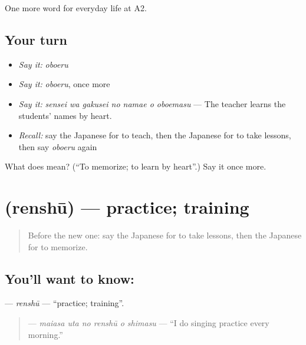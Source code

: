 \begin{grammarlens}[title={What you've built}]
One more word for everyday life at A2.
\end{grammarlens}

\subsection*{Your turn}
\begin{itemize}
\raggedright
  \item \emph{Say it:} \emph{oboeru}
  \item \emph{Say it:} \emph{oboeru}, once more
  \item \emph{Say it:} \emph{sensei wa gakusei no namae o oboemasu} — The teacher learns the students' names by heart.
  \item \emph{Recall:} say the Japanese for to teach, then the Japanese for to take lessons, then say \emph{oboeru} again
\end{itemize}

\begin{tcolorbox}[breakable,colback=teal!4,colframe=teal!35!black,title={Before you move on}]
What does  mean? (\textquotedblleft{}To memorize; to learn by heart\textquotedblright{}.) Say it once more.
\end{tcolorbox}
\section[\texorpdfstring{\ja{れんしゅう} (renshū)}{れんしゅう (renshū)}]{ (renshū) — practice; training}

\label{lesson:JA-C225-renshuu}



\begin{quote}
Before the new one: say the Japanese for to take lessons, then the Japanese for to memorize.
\end{quote}

\subsection*{You'll want to know: }
\textbf{} — \emph{renshū} — \textquotedblleft{}practice; training\textquotedblright{}.

\begin{quote}
\textbf{   } — \emph{maiasa uta no renshū o shimasu} — \textquotedblleft{}I do singing practice every morning.\textquotedblright{}
\end{quote}

